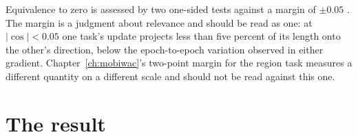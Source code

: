 Equivalence to zero is assessed by two one-sided tests against a margin of $\pm 0.05$
\cite{lakens2017tost}. The margin is a judgment about relevance and should be read as one: at
$|\cos| < 0.05$ one task's update projects less than five percent of its length onto the other's
direction, below the epoch-to-epoch variation observed in either gradient. Chapter~\ref{ch:mobiwac}'s two-point margin for the region task measures a
different quantity on a different scale and should not be read against this one.
%
%

\section{The result}
\label{apx:cosine:result}

